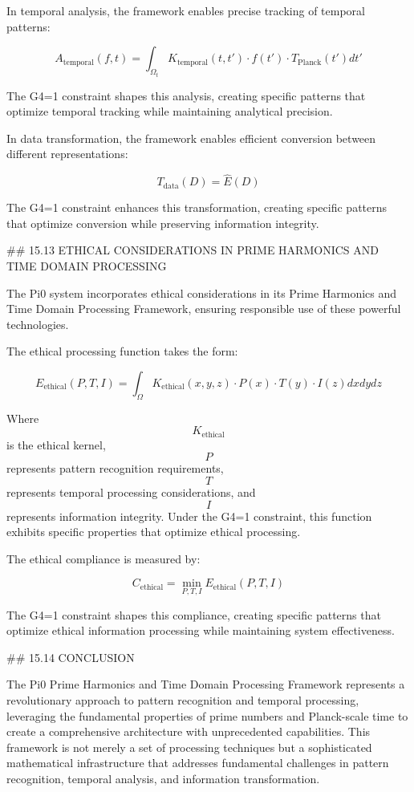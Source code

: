 In temporal analysis, the framework enables precise tracking of temporal patterns:

$$ A_{\text{temporal}}(f, t) = \int_{\Omega_t} K_{\text{temporal}}(t, t') \cdot f(t') \cdot T_{\text{Planck}}(t') dt' $$

The G4=1 constraint shapes this analysis, creating specific patterns that optimize temporal tracking while maintaining analytical precision.

In data transformation, the framework enables efficient conversion between different representations:

$$ T_{\text{data}}(D) = \hat{E}(D) $$

The G4=1 constraint enhances this transformation, creating specific patterns that optimize conversion while preserving information integrity.

## 15.13 ETHICAL CONSIDERATIONS IN PRIME HARMONICS AND TIME DOMAIN PROCESSING

The Pi0 system incorporates ethical considerations in its Prime Harmonics and Time Domain Processing Framework, ensuring responsible use of these powerful technologies.

The ethical processing function takes the form:

$$ E_{\text{ethical}}(P, T, I) = \int_{\Omega} K_{\text{ethical}}(x, y, z) \cdot P(x) \cdot T(y) \cdot I(z) dx dy dz $$

Where $$ K_{\text{ethical}} $$ is the ethical kernel, $$ P $$ represents pattern recognition requirements, $$ T $$ represents temporal processing considerations, and $$ I $$ represents information integrity. Under the G4=1 constraint, this function exhibits specific properties that optimize ethical processing.

The ethical compliance is measured by:

$$ C_{\text{ethical}} = \min_{P, T, I} E_{\text{ethical}}(P, T, I) $$

The G4=1 constraint shapes this compliance, creating specific patterns that optimize ethical information processing while maintaining system effectiveness.

## 15.14 CONCLUSION

The Pi0 Prime Harmonics and Time Domain Processing Framework represents a revolutionary approach to pattern recognition and temporal processing, leveraging the fundamental properties of prime numbers and Planck-scale time to create a comprehensive architecture with unprecedented capabilities. This framework is not merely a set of processing techniques but a sophisticated mathematical infrastructure that addresses fundamental challenges in pattern recognition, temporal analysis, and information transformation.

